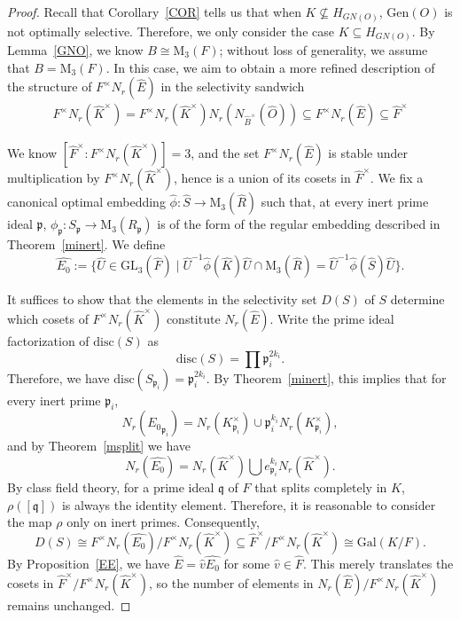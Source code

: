 \documentclass[12pt]{article}
\theoremstyle{plain}
\theoremstyle{definition}
\theoremstyle{remark}
\begin{document}
\begin{proof}
Recall that Corollary~\ref{COR} tells us that when $K \not\subseteq H_{GN(O)}$, $\mathrm{Gen}(O)$ is not optimally selective. Therefore, we only consider the case $K \subseteq H_{GN(O)}$. By Lemma~\ref{GNO}, we know $B\cong \mathrm{M}_3(F)$; without loss of generality, we assume that $B= \mathrm{M}_3(F)$. In this case, we aim to obtain a more refined description of the structure of $F^\times N_r(\widehat{E})$ in the selectivity sandwich
\begin{align*}
F^\times N_r(\widehat{K}^\times)= F^\times N_r(\widehat{K}^\times)N_r(N_{\widehat{B}^\times}(\widehat{O}))\subseteq F^\times N_r(\widehat{E})\subseteq \widehat{F}^\times \tag{*}
\end{align*}

We know $[\widehat{F}^\times:F^\times N_r(\widehat{K}^\times)]=3$, and the set $F^\times N_r(\widehat{E})$ is stable under multiplication by $F^\times N_r(\widehat{K}^\times)$, hence is a union of its cosets in $\widehat{F}^\times$. We fix a canonical optimal embedding $\widehat{\phi}:\widehat{S}\rightarrow \mathrm{M}_3(\widehat{R})$ such that, at every inert prime ideal $\mathfrak{p}$, $\phi_\mathfrak{p}: S_\mathfrak{p}\rightarrow \mathrm{M}_3(R_\mathfrak{p})$ is of the form of the regular embedding described in Theorem~\ref{minert}. We define 
$$\widehat{E_0}:= \{\widehat{U}\in \mathrm{GL}_3(\widehat{F})\mid \widehat{U}^{-1}\widehat{\phi}(\widehat{K})\widehat{U}\cap \mathrm{M}_3(\widehat{R})= \widehat{U}^{-1}\widehat{\phi}(\widehat{S})\widehat{U}\}.$$

It suffices to show that the elements in the selectivity set $D(S)$ of $S$ determine which cosets of $F^\times N_r(\widehat{K}^\times)$ constitute $N_r(\widehat{E})$. Write the prime ideal factorization of $\mathrm{disc}(S)$ as 
$$\mathrm{disc}(S)=\prod\mathfrak{p}_i^{2k_i}.$$
Therefore, we have $\mathrm{disc}(S_{\mathfrak{p}_i})=\mathfrak{p}_i^{2k_i}$. By Theorem~\ref{minert}, this implies that for every inert prime $\mathfrak{p}_i$,
$$N_r({E_0}_{\mathfrak{p}_i})=N_r(K^\times_{\mathfrak{p}_i})\cup \mathfrak{p}_i^{k_i}N_r(K^\times_{\mathfrak{p}_i}),$$
and by Theorem~\ref{msplit} we have 
$$N_r(\widehat{E_0})=N_r(\widehat{K}^\times)\bigcup e_{\mathfrak{p}_i}^{k_i}N_r(\widehat{K}^\times).$$
By class field theory, for a prime ideal $\mathfrak{q}$ of $F$ that splits completely in $K$, $\rho([\mathfrak{q}])$ is always the identity element. Therefore, it is reasonable to consider the map $\rho$ only on inert primes. Consequently,
$$D(S)\cong F^\times N_r(\widehat{E_0})/F^\times N_r(\widehat{K}^\times)\subseteq  \widehat{F}^\times/F^\times N_r(\widehat{K}^\times)\cong \mathrm{Gal}(K/F).$$
By Proposition~\ref{EE}, we have $\widehat{E}=\widehat{v}\widehat{E_0}$ for some $\widehat{v}\in \widehat{F}$. This merely translates the cosets in $\widehat{F}^\times/F^\times N_r(\widehat{K}^\times)$, so the number of elements in $N_r(\widehat{E})/F^\times N_r(\widehat{K}^\times)$ remains unchanged.


\end{proof}
\end{document}
